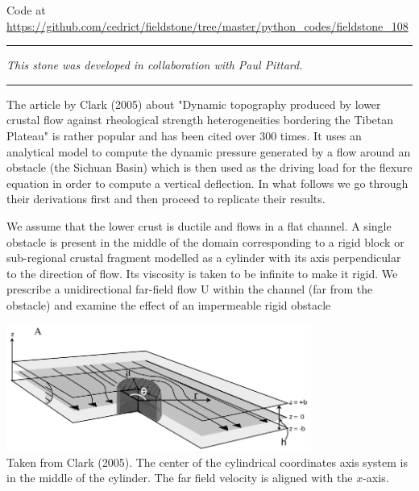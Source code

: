 


\begin{center}
Code at \url{https://github.com/cedrict/fieldstone/tree/master/python_codes/fieldstone_108}
\end{center}

\par\noindent\rule{\textwidth}{0.4pt}

{\sl This stone was developed in collaboration with Paul Pittard.} 

\par\noindent\rule{\textwidth}{0.4pt}


The article by Clark \etal (2005) \cite{clbr05} about "Dynamic topography produced by lower crustal flow against rheological strength heterogeneities bordering the Tibetan Plateau" is rather popular and has been cited over 300 times. It uses an analytical model to compute the 
dynamic pressure generated by a flow around an obstacle (the Sichuan Basin) which is then used as the driving load for the flexure equation in 
order to compute a vertical deflection. In what follows we go through their derivations first and then proceed to replicate their results.  

We assume that the lower crust is ductile and flows in a flat channel. A single obstacle is present in the middle 
of the domain corresponding to a rigid block or sub-regional crustal fragment modelled as a cylinder with its axis perpendicular 
to the direction of flow.
Its viscosity is taken to be infinite to make it rigid. 
We prescribe a unidirectional far-field flow U within the channel (far from the obstacle) and examine the effect of an impermeable rigid obstacle 

\begin{center}
\includegraphics[width=10cm]{python_codes/fieldstone_108/images/clbr05a}\\
{\captionfont 
Taken from Clark \etal (2005). The center of the cylindrical coordinates axis system is in the middle of the cylinder.  
The far field velocity is aligned with the $x$-axis.}
\end{center}

